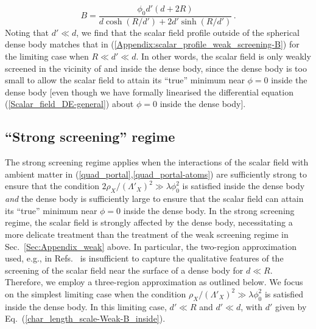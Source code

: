 \documentclass[aps,prd,onecolumn,nofootinbib]{revtex4-2} %
\begin{document}
\begin{equation}
\label{coeffn-B_Weak-B_inside}
B = \frac{ \phi_0 d' \left( d+2R \right)  }{  d \cosh \left( R/d' \right) + 2d' \sinh \left( R/d' \right)  }  \, . 
\end{equation}
Noting that $d' \ll d$, we find that the scalar field profile outside of the spherical dense body matches that in (\ref{Appendix:scalar_profile_weak_screening-B}) for the limiting case when $R \ll d' \ll d$. 
In other words, the scalar field is only weakly screened in the vicinity of and inside the dense body, since the dense body is too small to allow the scalar field to attain its ``true'' minimum near $\phi = 0$ inside the dense body [even though we have formally linearised the differential equation (\ref{Scalar_field_DE-general}) about $\phi = 0$ inside the dense body]. 



\subsection{``Strong screening'' regime}
\label{Sec:Appendix_strong}
The strong screening regime applies when the interactions of the scalar field with ambient matter in (\ref{quad_portal},\ref{quad_portal-atoms}) are sufficiently strong to ensure that the condition $2 \rho_X / (\Lambda'_X)^2 \gg \lambda \phi_0^2$ is satisfied inside the dense body \textit{and} the dense body is sufficiently large to ensure that the scalar field can attain its ``true'' minimum near $\phi = 0$ inside the dense body. 
In the strong screening regime, the scalar field is strongly affected by the dense body, necessitating a more delicate treatment than the treatment of the weak screening regime in Sec.~\ref{Sec:Appendix_weak} above. 
In particular, the two-region approximation used, e.g., in Refs.~\cite{Khoury_2010-symmetron,Vardanyan_2019-symmetron} is insufficient to capture the qualitative features of the screening of the scalar field near the surface of a dense body for $d \ll R$. 
Therefore, we employ a three-region approximation as outlined below. 
We focus on the simplest limiting case when the condition $\rho_X / (\Lambda'_X)^2 \gg \lambda \phi_0^2$ is satisfied inside the dense body. 
In this limiting case, $d' \ll R$ and $d' \ll d$, with $d'$ given by Eq.~(\ref{char_length_scale-Weak-B_inside}). 
\end{document}
